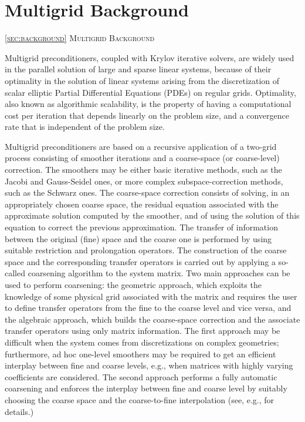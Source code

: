 \section{Multigrid Background\label{sec:background}}
         {\textsc{\ref{sec:background} Multigrid Background}}

Multigrid preconditioners, coupled with Krylov iterative
solvers, are widely used in the parallel solution of large and sparse linear systems,
because of their optimality in the solution of linear systems arising from the
discretization of scalar elliptic Partial Differential Equations (PDEs) on regular grids.
Optimality, also known as algorithmic scalability, is the property 
of having a computational cost per iteration that depends linearly on
the problem size, and a convergence rate that is independent of the problem size.

Multigrid preconditioners are based on a recursive application of a two-grid process
consisting of smoother iterations and a coarse-space (or coarse-level) correction.
The smoothers may be either basic iterative methods, such as the Jacobi and Gauss-Seidel ones,
or more complex subspace-correction methods, such as the Schwarz ones.
The coarse-space correction consists of solving, in an appropriately chosen
coarse space, the residual equation associated with the approximate solution computed
by the smoother, and of using the solution of this equation to correct the
previous approximation. The transfer of information between the original
(fine) space and the coarse one is performed by using suitable restriction and
prolongation operators. The construction of the coarse space and the corresponding
transfer operators is carried out by applying a so-called coarsening algorithm to the system
matrix. Two main approaches can be used to perform coarsening: the geometric approach,
which exploits the knowledge of some physical grid associated with the matrix
and requires the user to define transfer operators from the fine
to the coarse level and vice versa, and the algebraic approach, which builds
the coarse-space correction and the associate transfer operators using only matrix
information. The first approach may be difficult when the system comes from
discretizations on complex geometries;
furthermore, ad hoc one-level smoothers may be required to get an efficient
interplay between fine and coarse levels, e.g., when matrices with highly varying coefficients
are considered. The second approach performs a fully automatic coarsening and enforces the
interplay between fine and coarse level by suitably choosing the coarse space and
the coarse-to-fine interpolation (see, e.g., \cite{Briggs2000,Stuben_01,dd2_96} for details.)

